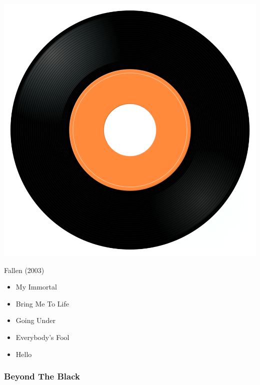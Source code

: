 \begin{minipage}[t]{0.25\textwidth}
\captionsetup{type=figure}
\includegraphics[width=\textwidth]{Images/cover.png}
\caption*{Fallen (2003)}
\end{minipage}
\begin{minipage}[t]{0.25\textwidth}\vspace{0pt}
\begin{itemize}[nosep,leftmargin=1em,labelwidth=*,align=left]
	\setlength{\itemsep}{0pt}
	\item My Immortal 
	\item Bring Me To Life
	\item Going Under
	\item Everybody's Fool
	\item Hello
\end{itemize}
\end{minipage}

\subsubsection{Beyond The Black}

